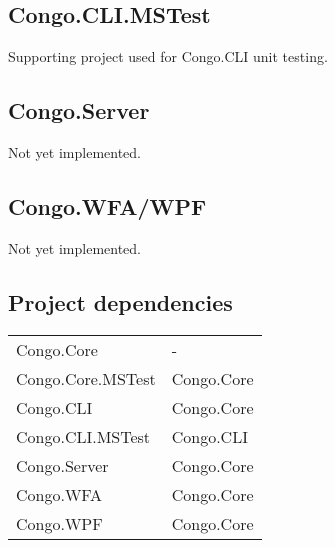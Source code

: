 \subsection{Congo.CLI.MSTest}

Supporting project used for \textsf{Congo.CLI} unit testing.

\subsection{Congo.Server}

Not yet implemented.

\subsection{Congo.WFA/WPF}

Not yet implemented.

\subsection{Project dependencies}

\begin{center}
\begin{tabular}{ l | l }
Congo.Core        & -          \\
Congo.Core.MSTest & Congo.Core \\
Congo.CLI         & Congo.Core \\
Congo.CLI.MSTest  & Congo.CLI  \\
Congo.Server      & Congo.Core \\
Congo.WFA         & Congo.Core \\
Congo.WPF         & Congo.Core
\end{tabular}
\end{center}
